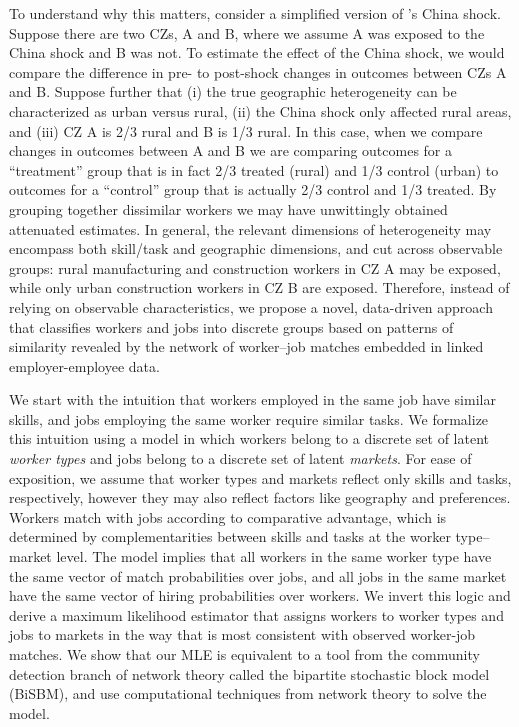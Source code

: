 \documentclass[12pt]{article}
\theoremstyle{definition}
\theoremstyle{plain}
\begin{document}
To understand why this matters, consider a simplified version of \citet{AutorDornHanson2013}'s China shock. Suppose there are two CZs, A and B, where we assume A was exposed to the China shock and B was not. To estimate the effect of the China shock, we would compare the difference in pre- to post-shock changes in outcomes between CZs A and B. Suppose further that (i) the true geographic heterogeneity can be characterized as urban versus rural, (ii) the China shock only affected rural areas, and (iii)  CZ A is 2/3 rural and B is 1/3 rural. In this case, when we compare changes in outcomes between A and B we are comparing outcomes for a ``treatment'' group that is in fact 2/3 treated (rural) and 1/3 control (urban) to outcomes for a ``control'' group that is actually 2/3 control and 1/3 treated. By grouping together dissimilar workers we may have unwittingly obtained attenuated estimates. In general, the relevant dimensions of heterogeneity may encompass both skill/task and geographic dimensions, and cut across observable groups: rural manufacturing and construction workers in CZ A may be exposed, while only urban construction workers in CZ B are exposed. Therefore, instead of relying on observable characteristics, we propose a novel, data-driven approach that classifies workers and jobs into discrete groups based on patterns of similarity revealed by the network of worker--job matches embedded in linked employer-employee data. 

We start with the intuition that workers employed in the same job have similar skills, and jobs employing the same worker require similar tasks. We formalize this intuition using a \citet{Roy1951} model in which workers belong to a discrete set of latent \emph{worker types} and jobs belong to a discrete set of latent \emph{markets}. For ease of exposition, we assume that worker types and markets reflect only skills and tasks, respectively, however they may also reflect factors like geography and preferences.  Workers match with jobs according to comparative advantage, which is determined by complementarities between skills and tasks at the worker type--market level. The model implies that all workers in the same worker type have the same vector of match probabilities over jobs, and all jobs in the same market  have the same vector of hiring probabilities over workers. We invert this logic and derive a maximum likelihood estimator that assigns workers to worker types and jobs to markets in the way that is most consistent with observed worker-job matches. We show that our MLE is equivalent to a tool from the community detection branch of network theory called the bipartite stochastic block model (BiSBM), and use computational techniques from network theory to solve the model. 
\end{document}
